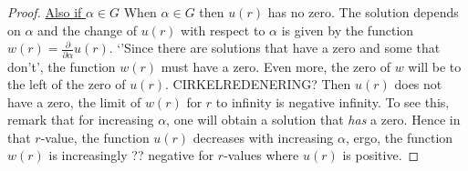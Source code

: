 \begin{lemma}
\begin{proof}
\underline{Also if $\alpha\in G$} When $\alpha\in G$ then $u(r)$ has no zero. The solution depends on $\alpha$ and the change of $u(r)$ with respect to $\alpha$ is given by the function $w(r)=\frac{\partial}{\partial\alpha}u(r)$. `'Since there are solutions that have a zero and some that don't', the function $w(r)$ must have a zero. Even more, the zero of $w$ will be to the left of the zero of $u(r)$. CIRKELREDENERING? Then $u(r)$ does not have a zero, the limit of $w(r)$ for $r$ to infinity is negative infinity. To see this, remark that for increasing $\alpha$, one will obtain a solution that \emph{has} a zero. Hence in that $r$-value, the function $u(r)$ decreases with increasing $\alpha$, ergo, the function $w(r)$ is increasingly ?? negative for $r$-values where $u(r)$ is positive.


\end{proof}
\end{lemma}
